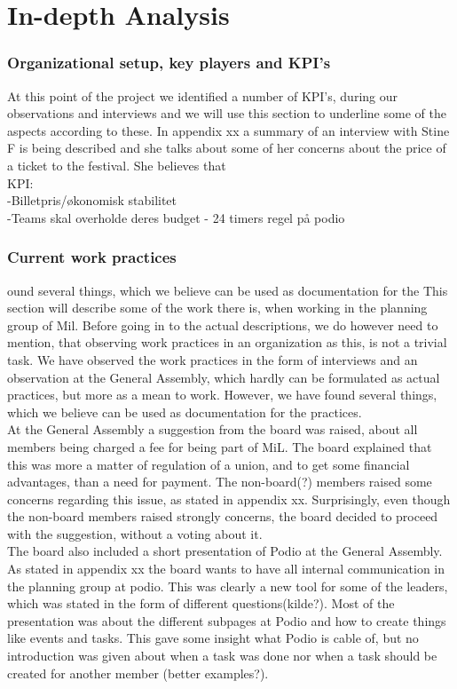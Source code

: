 \part{In-depth Analysis}

\section{Organizational setup, key players and KPI's}
At this point of the project we identified a number of KPI's, during our observations and interviews and we will use this section to underline some of the aspects according to these.
In appendix xx a summary of an interview with Stine F is being described and she talks about some of her concerns about the price of a ticket to the festival. She believes that \\
KPI:\\
-Billetpris/økonomisk stabilitet\\
-Teams skal overholde deres budget
- 24 timers regel på podio
\section{Current work practices}
ound several things, which we believe can be used as documentation for the
This section will describe some of the work there is, when working in the planning group of Mil. Before going in to the actual descriptions, we do however need to mention, that observing work practices in an organization as this, is not a trivial task. We have observed the work practices in the form of interviews and an observation at the General Assembly, which hardly can be formulated as actual practices, but more as a mean to work. However, we have found several things, which we believe can be used as documentation for the practices. \\
At the General Assembly a suggestion from the board was raised, about all members being charged a fee for being part of MiL. The board explained that this was more a matter of regulation of a union, and to get some financial advantages, than a need for payment. The non-board(?) members raised some concerns regarding this issue, as stated in appendix xx. Surprisingly, even though the non-board members raised strongly concerns, the board decided to proceed with the suggestion, without a voting about it. \\
The board also included a short presentation of Podio at the General Assembly. As stated in appendix xx the board wants to have all internal communication in the planning group at podio. This was clearly a new tool for some of the leaders, which was stated in the form of different questions(kilde?). Most of the presentation was about the different subpages at Podio and how to create things like events and tasks. This gave some insight what Podio is cable of, but no introduction was given about when a task was done nor when a task should be created for another member (better examples?). \\
 
